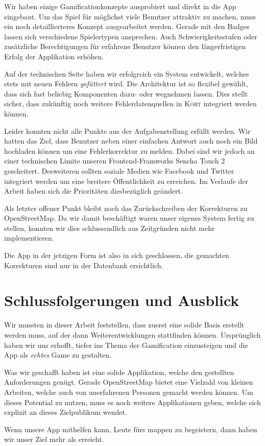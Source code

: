 Wir haben einige Gamificationkonzepte ausprobiert und direkt in die App eingebaut.
Um das Spiel für möglichst viele Benutzer attraktiv zu machen, muss ein noch detaillierteres Konzept ausgearbeitet werden.
Gerade mit den Badges lassen sich verschiedene Spielertypen ansprechen.
Auch Schwierigkeitsstufen oder zusätzliche Berechtigungen für erfahrene Benutzer können den längerfristigen Erfolg der Applikation erhöhen.

Auf der technischen Seite haben wir erfolgreich ein System entwickelt, welches stets mit neuen Fehlern \emph{gefüttert} wird.
Die Architektur ist so flexibel gewählt, dass sich fast beliebig Komponenten dazu- oder wegnehmen lassen.
Dies stellt sicher, dass zukünftig noch weitere Fehlerdatenquellen in \textsc{Kort} integriert werden können.

Leider konnten nicht alle Punkte aus der Aufgabenstellung erfüllt werden.
Wir hatten das Ziel, dass Benutzer neben einer einfachen Antwort auch noch ein Bild hochladen können um eine Fehlerkorrektur zu melden.
Dabei sind wir jedoch an einer technischen Limite unseren Frontend-Framworks Sencha Touch 2 gescheitert.
Desweiteren sollten soziale Medien wie Facebook und Twitter integriert werden um eine breitere Öffentlichkeit zu erreichen.
Im Verlaufe der Arbeit haben sich die Prioritäten diesbezüglich geändert.

Als letzter offener Punkt bleibt noch das Zurückschreiben der Korrekturen zu \gls{OpenStreetMap}.
Da wir damit beschäftigt waren unser eigenes System fertig zu stellen, konnten wir dies schlussendlich aus Zeitgründen nicht mehr implementieren.

Die App in der jetzigen Form ist also in sich geschlossen, die gemachten Korrekturen sind nur in der Datenbank ersichtlich.

\section{Schlussfolgerungen und Ausblick}
Wir mussten in dieser Arbeit feststellen, dass zuerst eine solide Basis erstellt werden muss, auf der dann Weiterentwicklungen stattfinden können.
Ursprünglich haben wir uns erhofft, tiefer ins Thema der \gls{Gamification} einzusteigen und die App als \emph{echtes} Game zu gestalten.

Was wir geschafft haben ist eine solide Applikation, welche den gestellten Anforderungen genügt.
Gerade \gls{OpenStreetMap} bietet eine Vielzahl von kleinen Arbeiten, welche auch von unerfahrenen Personen gemacht werden können.
Um dieses Potential zu nutzen, muss es noch weitere Applikationen geben, welche sich explizit an dieses Zielpublikum wendet.

Wenn unsere App mithelfen kann, Leute fürs mappen zu begeistern, dann haben wir unser  Ziel mehr als erreicht.